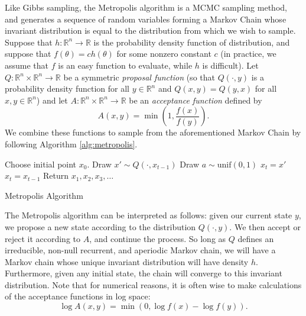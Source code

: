 Like Gibbs sampling, the Metropolis algorithm is a MCMC sampling method, and generates a sequence of random
variables forming a Markov Chain whose invariant distribution is equal to the distribution from which we wish
to sample. Suppose that $h : \mathbb{R}^n \rightarrow \mathbb{R}$ is the probability density function of distribution,
and suppose that $f(\theta) = ch(\theta)$ for some nonzero constant $c$ (in practice, we assume that $f$ is an easy
function to evaluate, while $h$ is difficult). Let $Q : \mathbb{R}^n \times \mathbb{R}^n \rightarrow \mathbb{R}$ be
a symmetric \emph{proposal function}
(so that $Q(\cdot, y)$ is a probability density function for all $y \in \mathbb{R}^n$
 and $Q(x,y) = Q(y,x)$ for all $x,y \in \mathbb{R}^n$) and let
 $A : \mathbb{R}^n \times \mathbb{R}^n \rightarrow \mathbb{R}$ be an \emph{acceptance function} defined by
\[
A(x,y) = \min\left(1, \frac{f(x)}{f(y)}\right).
\]
We combine these functions to sample from the aforementioned Markov Chain by following Algorithm \ref{alg:metropolis}.
\begin{algorithm}
\begin{algorithmic}[1]
    \State \textrm{Choose initial point } $x_0$.
        \State \textrm{Draw } $x' \sim Q(\cdot, x_{t-1})$
        \State \textrm{Draw } $a \sim \text{unif}(0,1)$
            \State $x_t = x'$
        \Else
            \State $x_t = x_{t-1}$
        \EndIf
    \EndFor
    \State \textrm{Return } $x_1,x_2,x_3,\ldots$
\EndProcedure
\end{algorithmic}
\caption{Metropolis Algorithm}
\label{alg:metropolis}
\end{algorithm}
The Metropolis algorithm can be interpreted as follows:
given our current state $y$, we propose a new state according to the distribution $Q(\cdot, y)$. We then accept or reject it according to $A$, and continue the process. So long as $Q$ defines an irreducible, non-null recurrent, and aperiodic Markov chain, we will have a Markov chain whose unique invariant distribution will have density $h$. Furthermore, given any initial state, the chain will converge to this invariant distribution.
Note that for numerical reasons, it is often wise to make calculations of the acceptance functions in log space:
\[
\log A(x,y) = \min(0, \log f(x) - \log f(y)).
\]


